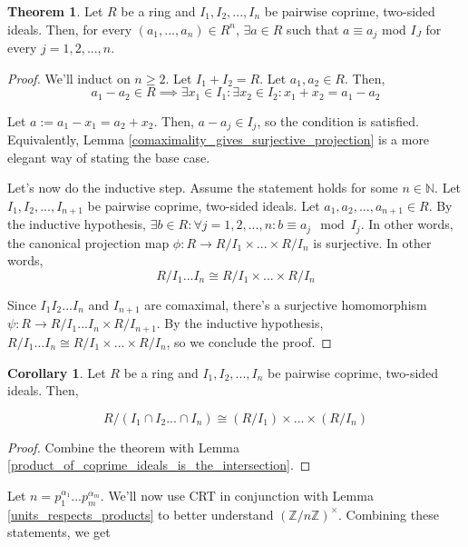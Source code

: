 \documentclass{article}
\theoremstyle{definition}
\newtheorem{theorem}{Theorem}[section]
\newtheorem{corollary}{Corollary}[theorem]
\newcommand{\N}{\mathbb{N}}
\newcommand{\Z}{\mathbb{Z}}
\begin{document}
\begin{theorem}
    Let $R$ be a ring and $I_{1},I_{2},...,I_{n}$ be pairwise coprime, two-sided ideals. Then, for every $(a_{1},...,a_{n}) \in R^{n}$,
    $\exists a \in R$ such that $a \equiv a_{j}$ mod $I_{J}$ for every $j = 1,2,...,n$.
\end{theorem}
\begin{proof}
    We'll induct on $n \geq 2$. Let $I_{1} + I_{2} = R$. 
    Let $a_{1},a_{2} \in R$.
    Then, 
    \[ a_{1} - a_{2} \in R \implies \exists x_{1} \in I_{1}: \exists x_{2} \in I_{2}: x_{1} + x_{2} = a_{1} - a_{2}\]

    Let $a := a_{1} - x_{1} = a_{2} + x_{2}$. Then, $a - a_{j} \in I_{j}$, so the condition is satisfied.
    Equivalently, Lemma \ref{comaximality_gives_surjective_projection} is a more elegant way of stating the base case.


    Let's now do the inductive step. Assume the statement holds for some $n \in \N$.
    Let $I_{1}, I_{2},...,I_{n+1}$ be pairwise coprime, two-sided ideals.
    Let $a_{1},a_{2},...,a_{n+1} \in R$.
    By the inductive hypothesis, $\exists b \in R: \forall j = 1,2,...,n: b \equiv a_{j} \mod{I_{j}}$.
    In other words, the canonical projection map 
    $\phi: R \xrightarrow{} R/I_{1} \times ... \times R/I_{n}$ is surjective. In other words,
    \[ R/I_{1}...I_{n} \cong R/I_{1} \times ... \times R/I_{n} \]

    Since $I_{1}I_{2}...I_{n}$ and $I_{n+1}$ are comaximal, there's a surjective
    homomorphism $\psi: R \xrightarrow{} R/I_{1}...I_{n} \times R/I_{n+1}$.
    By the inductive hypothesis, $R/I_{1}...I_{n}  \cong R/I_{1} \times ... \times R/I_{n}$,
    so we conclude the proof.
        
\end{proof}

\begin{corollary}
    Let $R$ be a ring and $I_{1},I_{2},...,I_{n}$ be pairwise coprime, two-sided ideals. Then,

    \[ R / (I_{1} \cap I_{2} ... \cap I_{n}) \cong (R/I_{1}) \times ... \times (R/I_{n}) \]
\end{corollary}
\begin{proof}
    Combine the theorem with Lemma \ref{product_of_coprime_ideals_is_the_intersection}.
\end{proof}

Let $n = p_{1}^{\alpha_{1}}...p_{m}^{\alpha_{m}}$.
We'll now use CRT in conjunction with Lemma \ref{units_respects_products}
to better understand $(\Z / n\Z)^{\times}$. Combining these statements, we get
\end{document}
